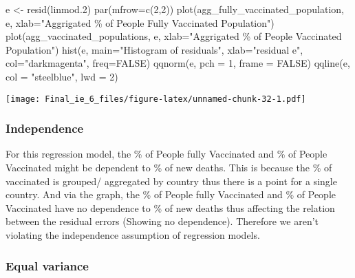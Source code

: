 \documentclass[
  12pt,
]{article}
\newenvironment{Shaded}{\begin{snugshade}}{\end{snugshade}}
\newcommand{\AttributeTok}[1]{\textcolor[rgb]{0.77,0.63,0.00}{#1}}
\newcommand{\ConstantTok}[1]{\textcolor[rgb]{0.00,0.00,0.00}{#1}}
\newcommand{\DecValTok}[1]{\textcolor[rgb]{0.00,0.00,0.81}{#1}}
\newcommand{\FloatTok}[1]{\textcolor[rgb]{0.00,0.00,0.81}{#1}}
\newcommand{\FunctionTok}[1]{\textcolor[rgb]{0.00,0.00,0.00}{#1}}
\newcommand{\NormalTok}[1]{#1}
\newcommand{\OtherTok}[1]{\textcolor[rgb]{0.56,0.35,0.01}{#1}}
\newcommand{\StringTok}[1]{\textcolor[rgb]{0.31,0.60,0.02}{#1}}
\begin{document}
\begin{Shaded}
\begin{Highlighting}[]
\NormalTok{e }\OtherTok{\textless{}{-}} \FunctionTok{resid}\NormalTok{(linmod}\FloatTok{.2}\NormalTok{)}
\FunctionTok{par}\NormalTok{(}\AttributeTok{mfrow=}\FunctionTok{c}\NormalTok{(}\DecValTok{2}\NormalTok{,}\DecValTok{2}\NormalTok{))}
\FunctionTok{plot}\NormalTok{(agg\_fully\_vaccinated\_population, e, }\AttributeTok{xlab=}\StringTok{"Aggrigated \% of People Fully Vaccinated Population"}\NormalTok{)}
\FunctionTok{plot}\NormalTok{(agg\_vaccinated\_populations, e, }\AttributeTok{xlab=}\StringTok{"Aggrigated \% of People Vaccinated Population"}\NormalTok{)}
\FunctionTok{hist}\NormalTok{(e, }\AttributeTok{main=}\StringTok{"Histogram of residuals"}\NormalTok{, }\AttributeTok{xlab=}\StringTok{"residual e"}\NormalTok{, }\AttributeTok{col=}\StringTok{"darkmagenta"}\NormalTok{, }\AttributeTok{freq=}\ConstantTok{FALSE}\NormalTok{)}
\FunctionTok{qqnorm}\NormalTok{(e, }\AttributeTok{pch =} \DecValTok{1}\NormalTok{, }\AttributeTok{frame =} \ConstantTok{FALSE}\NormalTok{)}
\FunctionTok{qqline}\NormalTok{(e, }\AttributeTok{col =} \StringTok{"steelblue"}\NormalTok{, }\AttributeTok{lwd =} \DecValTok{2}\NormalTok{)}
\end{Highlighting}
\end{Shaded}

\texttt{[image: Final\_ie\_6\_files/figure-latex/unnamed-chunk-32-1.pdf]}

\hypertarget{independence-2}{%
\subsubsection{Independence}\label{independence-2}}

For this regression model, the \% of People fully Vaccinated and \% of
People Vaccinated might be dependent to \% of new deaths. This is
because the \% of vaccinated is grouped/ aggregated by country thus
there is a point for a single country. And via the graph, the \% of
People fully Vaccinated and \% of People Vaccinated have no dependence
to \% of new deaths thus affecting the relation between the residual
errors (Showing no dependence). Therefore we aren't violating the
independence assumption of regression models.

\hypertarget{equal-variance-2}{%
\subsubsection{Equal variance}\label{equal-variance-2}}
\end{document}
